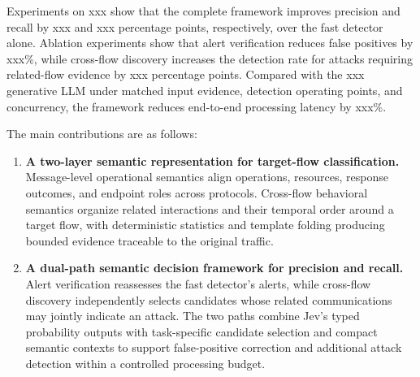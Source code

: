 Experiments on xxx show that the complete framework improves precision and recall by xxx and xxx percentage points, respectively, over the fast detector alone.
Ablation experiments show that alert verification reduces false positives by xxx\%, while cross-flow discovery increases the detection rate for attacks requiring related-flow evidence by xxx percentage points.
Compared with the xxx generative LLM under matched input evidence, detection operating points, and concurrency, the framework reduces end-to-end processing latency by xxx\%.

The main contributions are as follows:
\begin{enumerate}
    \item \textbf{A two-layer semantic representation for target-flow classification.}
    Message-level operational semantics align operations, resources, response outcomes, and endpoint roles across protocols.
    Cross-flow behavioral semantics organize related interactions and their temporal order around a target flow, with deterministic statistics and template folding producing bounded evidence traceable to the original traffic.
    \item \textbf{A dual-path semantic decision framework for precision and recall.}
    Alert verification reassesses the fast detector's alerts, while cross-flow discovery independently selects candidates whose related communications may jointly indicate an attack.
    The two paths combine Jev's typed probability outputs with task-specific candidate selection and compact semantic contexts to support false-positive correction and additional attack detection within a controlled processing budget.
\end{enumerate}
